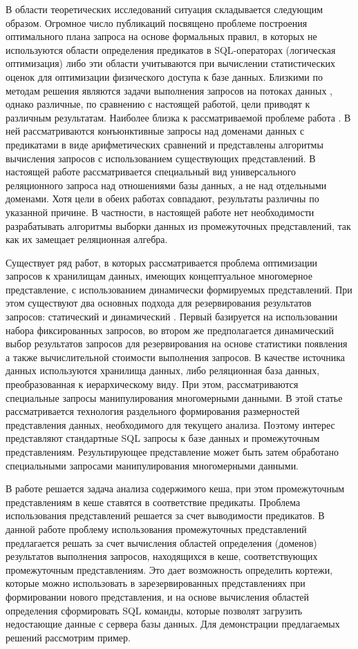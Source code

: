 \documentclass[10pt,a4paper]{article}
\begin{document}
В области теоретических исследований ситуация складывается следующим образом.
Огромное число публикаций посвящено проблеме построения оптимального плана
запроса на основе формальных правил, в которых не используются области
определения предикатов в SQL-операторах (логическая оптимизация) либо эти
области учитываются при вычислении статистических оценок для оптимизации
физического доступа к базе данных. Близкими по методам решения являются задачи
выполнения запросов на потоках данных \cite{Olston03, Denny05}, однако
различные, по сравнению с настоящей работой, цели приводят к различным
результатам. Наиболее близка к рассматриваемой проблеме работа \cite{Afrati06}.
В ней рассматриваются конъюнктивные запросы над доменами данных с предикатами
в виде арифметических сравнений и представлены алгоритмы вычисления запросов с
использованием существующих представлений. В настоящей работе рассматривается
специальный вид универсального реляционного запроса над отношениями базы данных,
а не над отдельными доменами. Хотя цели в обеих работах совпадают, результаты
различны по указанной причине. В частности, в настоящей работе нет необходимости
разрабатывать алгоритмы выборки данных из промежуточных представлений, так как
их замещает реляционная алгебра.

Существует ряд работ, в которых рассматривается проблема оптимизации
запросов к хранилищам данных, имеющих концептуальное многомерное представление,
с использованием динамически формируемых представлений. При этом
существуют два основных подхода для резервирования результатов запросов:
статический \cite{baralis, gupta, gupta-mumick} и динамический \cite{scheuermann, shim,
kalnis, chang}. Первый базируется на использовании набора фиксированных запросов,
во втором же предполагается динамический выбор результатов запросов для резервирования на
основе статистики появления а также вычислительной стоимости выполнения
запросов. В качестве источника данных используются хранилища данных, либо
реляционная база данных, преобразованная к иерархическому виду. При этом,
рассматриваются специальные запросы манипулирования многомерными данными. 
В этой статье рассматривается технология раздельного формирования размерностей
представления данных, необходимого для текущего анализа. Поэтому интерес
представляют стандартные SQL запросы к базе данных и промежуточным представлениям. 
Результирующее представление может быть затем обработано специальными запросами
манипулирования многомерными данными.

В работе \cite{Keller96} решается задача анализа содержимого кеша,
при этом промежуточным представлениям
в кеше ставятся в соответствие предикаты. Проблема использования представлений
решается за счет выводимости предикатов. В данной работе проблему использования
промежуточных представлений предлагается решать за счет вычисления областей
определения (доменов) результатов выполнения запросов, находящихся в кеше,
соответствующих промежуточным представлениям. Это дает возможность
определить кортежи, которые можно использовать в зарезервированных представлениях
при формировании нового представления, и на основе вычисления областей определения
сформировать SQL команды, которые позволят загрузить недостающие данные с сервера
базы данных. Для демонстрации предлагаемых решений рассмотрим пример.
\end{document}
